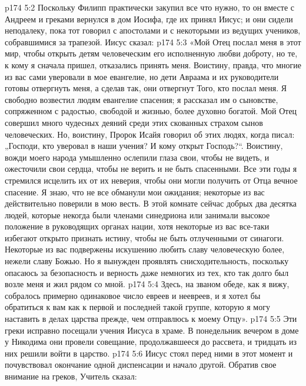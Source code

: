 \vs p174 5:2 Поскольку Филипп практически закупил все что нужно, то он вместе с Андреем и греками вернулся в дом Иосифа, где их принял Иисус; и они сидели неподалеку, пока тот говорил с апостолами и с некоторыми из ведущих учеников, собравшимися за трапезой. Иисус сказал:
\vs p174 5:3 \pc «Мой Отец послал меня в этот мир, чтобы открыть детям человеческим его исполненную любви доброту, но те, к кому я сначала пришел, отказались принять меня. Воистину, правда, что многие из вас сами уверовали в мое евангелие, но дети Авраама и их руководители готовы отвергнуть меня, а сделав так, они отвергнут Того, кто послал меня. Я свободно возвестил людям евангелие спасения; я рассказал им о сыновстве, сопряженном с радостью, свободой и жизнью, более духовно богатой. Мой Отец совершил много чудесных деяний среди этих скованных страхом сынов человеческих. Но, воистину, Пророк Исайя говорил об этих людях, когда писал: „Господи, кто уверовал в наши учения? И кому открыт Господь?“. Воистину, вожди моего народа умышленно ослепили глаза свои, чтобы не видеть, и ожесточили свои сердца, чтобы не верить и не быть спасенными. Все эти годы я стремился исцелить их от их неверия, чтобы они могли получить от Отца вечное спасение. Я знаю, что не все обманули мои ожидания; некоторые из вас действительно поверили в мою весть. В этой комнате сейчас добрых два десятка людей, которые некогда были членами синедриона или занимали высокое положение в руководящих органах нации, хотя некоторые из вас все\hyp{}таки избегают открыто признать истину, чтобы не быть отлученными от синагоги. Некоторые из вас подвержены искушению любить славу человеческую более, нежели славу Божью. Но я вынужден проявлять снисходительность, поскольку опасаюсь за безопасность и верность даже немногих из тех, кто так долго был возле меня и жил рядом со мной.
\vs p174 5:4 Здесь, на званом обеде, как я вижу, собралось примерно одинаковое число евреев и неевреев, и я хотел бы обратиться к вам как к первой и последней такой группе, которую я могу наставить в делах царства прежде, чем отправлюсь к моему Отцу».
\vs p174 5:5 Эти греки исправно посещали учения Иисуса в храме. В понедельник вечером в доме у Никодима они провели совещание, продолжавшееся до рассвета, и тридцать из них решили войти в царство.
\vs p174 5:6 Иисус стоял перед ними в этот момент и почувствовал окончание одной диспенсации и начало другой. Обратив свое внимание на греков, Учитель сказал:
